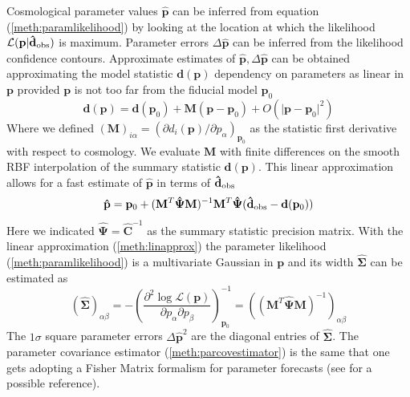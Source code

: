 \documentclass[reprint,aps,prd,superscriptaddress,showkeys,showpacs]{revtex4-1}
\newcommand{\bb}[1]{\mathbf{#1}}
\newcommand{\bbh}[1]{\mathbf{\hat{#1}}}
\begin{document}
%
Cosmological parameter values $\bbh{p}$ can be inferred from equation (\ref{meth:paramlikelihood}) by looking at the location at which the likelihood $\mathcal{L}(\bb{p}\vert\bbh{d}_{\rm obs})$ is maximum. Parameter errors $\Delta\bbh{p}$ can be inferred from the likelihood confidence contours. Approximate estimates of $\bbh{p},\Delta \bbh{p}$ can be obtained approximating the model statistic $\bb{d}(\bb{p})$ dependency on parameters as linear in $\bb{p}$ provided $\bb{p}$ is not too far from the fiducial model $\bb{p}_0$
\begin{equation}
\label{meth:linapprox}
\bb{d}(\bb{p}) = \bb{d}(\bb{p}_0) + \bb{M}(\bb{p}-\bb{p}_0) + O(\vert\bb{p}-\bb{p}_0\vert^2)
\end{equation} 
%
Where we defined $(\bb{M})_{i\alpha}=(\partial d_i(\bb{p})/\partial p_\alpha)_{\bb{p}_0}$ as the statistic first derivative with respect to cosmology. We evaluate $\bb{M}$ with finite differences on the smooth RBF interpolation of the summary statistic $\bb{d}(\bb{p})$. This linear approximation allows for a fast estimate of $\bbh{p}$ in terms of $\bbh{d}_{\rm obs}$
\begin{equation}
\label{meth:parestimate}
\bbh{p} = \bb{p}_0 + (\bb{M}^T\bbh{\Psi}\bb{M})^{-1}\bb{M}^T\bbh{\Psi}(\bbh{d}_{\rm obs}-\bb{d}(\bb{p}_0))
\end{equation}
%
Here we indicated $\bbh{\Psi}=\bbh{C}^{-1}$ as the summary statistic precision matrix. With the linear approximation (\ref{meth:linapprox}) the parameter likelihood (\ref{meth:paramlikelihood}) is a multivariate Gaussian in $\bb{p}$ and its width $\bbh{\Sigma}$ can be estimated as 
\begin{equation}
\label{meth:parcovestimator}
(\bbh{\Sigma})_{\alpha\beta} = -\left(\frac{\partial^2 \log \mathcal{L}(\bb{p})}{\partial p_\alpha \partial p_\beta}\right)^{-1}_{\bb{p}_0} = ((\bb{M}^T\bbh{\Psi}\bb{M})^{-1})_{\alpha\beta}
\end{equation}
%
The $1\sigma$ square parameter errors $\Delta \bbh{p}^2$ are the diagonal entries of $\bbh{\Sigma}$. The parameter covariance estimator (\ref{meth:parcovestimator}) is the same that one gets adopting a Fisher Matrix formalism for parameter forecasts (see \citep{astroMLText} for a possible reference).
\end{document}
